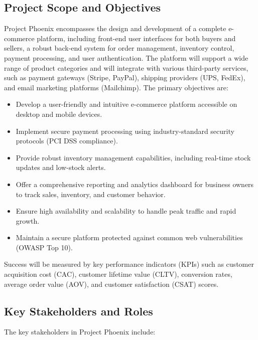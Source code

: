 \documentclass[11pt,a4paper,oneside]{article}
\begin{document}
\subsection{Project Scope and Objectives}

Project Phoenix encompasses the design and development of a complete e-commerce platform, including front-end user interfaces for both buyers and sellers, a robust back-end system for order management, inventory control, payment processing, and user authentication.  The platform will support a wide range of product categories and will integrate with various third-party services, such as payment gateways (Stripe, PayPal), shipping providers (UPS, FedEx), and email marketing platforms (Mailchimp).  The primary objectives are:

\begin{itemize}
    \item Develop a user-friendly and intuitive e-commerce platform accessible on desktop and mobile devices.
    \item Implement secure payment processing using industry-standard security protocols (PCI DSS compliance).
    \item Provide robust inventory management capabilities, including real-time stock updates and low-stock alerts.
    \item Offer a comprehensive reporting and analytics dashboard for business owners to track sales, inventory, and customer behavior.
    \item Ensure high availability and scalability to handle peak traffic and rapid growth.
    \item Maintain a secure platform protected against common web vulnerabilities (OWASP Top 10).
\end{itemize}

Success will be measured by key performance indicators (KPIs) such as customer acquisition cost (CAC), customer lifetime value (CLTV), conversion rates, average order value (AOV), and customer satisfaction (CSAT) scores.

\subsection{Key Stakeholders and Roles}

The key stakeholders in Project Phoenix include:
\end{document}
